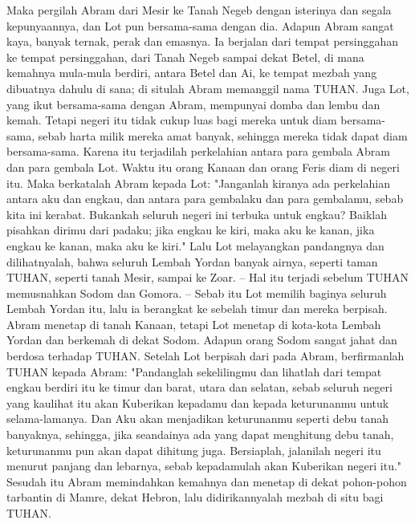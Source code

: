 \begin{biblechapter} %
 Maka pergilah Abram dari Mesir ke Tanah Negeb dengan isterinya dan segala kepunyaannya, dan Lot pun bersama-sama dengan dia.
\verse Adapun Abram sangat kaya, banyak ternak, perak dan emasnya.
\verse Ia berjalan dari tempat persinggahan ke tempat persinggahan, dari Tanah Negeb sampai dekat Betel, di mana kemahnya mula-mula berdiri, antara Betel dan Ai,
\verse ke tempat mezbah yang dibuatnya dahulu di sana; di situlah Abram memanggil nama TUHAN.
\verse Juga Lot, yang ikut bersama-sama dengan Abram, mempunyai domba dan lembu dan kemah.
\verse Tetapi negeri itu tidak cukup luas bagi mereka untuk diam bersama-sama, sebab harta milik mereka amat banyak, sehingga mereka tidak dapat diam bersama-sama.
\verse Karena itu terjadilah perkelahian antara para gembala Abram dan para gembala Lot. Waktu itu orang Kanaan dan orang Feris diam di negeri itu.
\verse Maka berkatalah Abram kepada Lot: "Janganlah kiranya ada perkelahian antara aku dan engkau, dan antara para gembalaku dan para gembalamu, sebab kita ini kerabat.
\verse Bukankah seluruh negeri ini terbuka untuk engkau? Baiklah pisahkan dirimu dari padaku; jika engkau ke kiri, maka aku ke kanan, jika engkau ke kanan, maka aku ke kiri."
\verse Lalu Lot melayangkan pandangnya dan dilihatnyalah, bahwa seluruh Lembah Yordan banyak airnya, seperti taman TUHAN, seperti tanah Mesir, sampai ke Zoar. -- Hal itu terjadi sebelum TUHAN memusnahkan Sodom dan Gomora. --
\verse Sebab itu Lot memilih baginya seluruh Lembah Yordan itu, lalu ia berangkat ke sebelah timur dan mereka berpisah.
\verse Abram menetap di tanah Kanaan, tetapi Lot menetap di kota-kota Lembah Yordan dan berkemah di dekat Sodom.
\verse Adapun orang Sodom sangat jahat dan berdosa terhadap TUHAN.
\verse Setelah Lot berpisah dari pada Abram, berfirmanlah TUHAN kepada Abram: "Pandanglah sekelilingmu dan lihatlah dari tempat engkau berdiri itu ke timur dan barat, utara dan selatan,
\verse sebab seluruh negeri yang kaulihat itu akan Kuberikan kepadamu dan kepada keturunanmu untuk selama-lamanya.
\verse Dan Aku akan menjadikan keturunanmu seperti debu tanah banyaknya, sehingga, jika seandainya ada yang dapat menghitung debu tanah, keturunanmu pun akan dapat dihitung juga.
\verse Bersiaplah, jalanilah negeri itu menurut panjang dan lebarnya, sebab kepadamulah akan Kuberikan negeri itu."
\verse Sesudah itu Abram memindahkan kemahnya dan menetap di dekat pohon-pohon tarbantin di Mamre, dekat Hebron, lalu didirikannyalah mezbah di situ bagi TUHAN.
\end{biblechapter}

